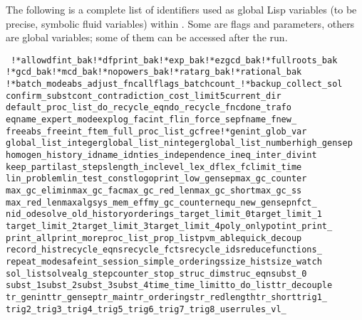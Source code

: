 The following is a complete list of identifiers used as global Lisp
variables (to be precise, symbolic fluid variables) within
.  Some are flags and parameters, others are global
variables; some of them can be accessed after the  run.
\begin{flushleft}\tt
  !*allowdfint\_bak\quad !*dfprint\_bak\quad !*exp\_bak\quad !*ezgcd\_bak\quad !*fullroots\_bak\quad
  !*gcd\_bak\quad !*mcd\_bak\quad !*nopowers\_bak\quad !*ratarg\_bak\quad !*rational\_bak\quad
  !*batch\_mode\quad abs\_\quad adjust\_fnc\quad allflags\_\quad batchcount\_\quad !*backup\_\quad collect\_sol\quad
  confirm\_subst\quad cont\_\quad contradiction\_\quad cost\_limit5\quad current\_dir\quad
  default\_proc\_list\_\quad do\_recycle\_eqn\quad do\_recycle\_fnc\quad done\_trafo\quad
  eqname\_\quad expert\_mode\quad explog\_\quad facint\_\quad flin\_\quad force\_sep\quad fname\_\quad fnew\_\quad
  freeabs\_\quad freeint\_\quad ftem\_\quad full\_proc\_list\_\quad gcfree!*\quad genint\_\quad glob\_var\quad
  global\_list\_integer\quad global\_list\_ninteger\quad global\_list\_number\quad high\_gensep\quad
  homogen\_\quad history\_\quad idname\_\quad idnties\_\quad independence\_\quad ineq\_\quad inter\_divint\quad
  keep\_parti\quad last\_steps\quad length\_inc\quad level\_\quad lex\_df\quad lex\_fc\quad limit\_time\quad
  lin\_problem\quad lin\_test\_const\quad logoprint\_\quad low\_gensep\quad max\_gc\_counter\quad
  max\_gc\_elimin\quad max\_gc\_fac\quad max\_gc\_red\_len\quad max\_gc\_short\quad max\_gc\_ss\quad
  max\_red\_len\quad maxalgsys\_\quad mem\_eff\quad my\_gc\_counter\quad nequ\_\quad new\_gensep\quad nfct\_\quad
  nid\_\quad odesolve\_\quad old\_history\quad orderings\_\quad target\_limit\_0\quad target\_limit\_1\quad
  target\_limit\_2\quad target\_limit\_3\quad target\_limit\_4\quad poly\_only\quad potint\_\quad print\_\quad
  print\_all\quad print\_more\quad proc\_list\_\quad prop\_list\quad pvm\_able\quad quick\_decoup\quad
  record\_hist\quad recycle\_eqns\quad recycle\_fcts\quad recycle\_ids\quad reducefunctions\_\quad
  repeat\_mode\quad safeint\_\quad session\_\quad simple\_orderings\quad size\_hist\quad size\_watch\quad
  sol\_list\quad solvealg\_\quad stepcounter\_\quad stop\_\quad struc\_dim\quad struc\_eqn\quad subst\_0\quad
  subst\_1\quad subst\_2\quad subst\_3\quad subst\_4\quad time\_\quad time\_limit\quad to\_do\_list\quad tr\_decouple\quad
  tr\_genint\quad tr\_gensep\quad tr\_main\quad tr\_orderings\quad tr\_redlength\quad tr\_short\quad trig1\_\quad
  trig2\_\quad trig3\_\quad trig4\_\quad trig5\_\quad trig6\_\quad trig7\_\quad trig8\_\quad userrules\_\quad vl\_
\end{flushleft}

